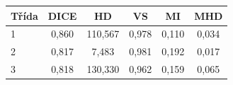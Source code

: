 \begin{tabular}{l c c c c c}
 \hline
Třída & DICE & HD & VS & MI & MHD \\ \hline
1 & 0,860 & 110,567 & 0,978 & 0,110 & 0,034 \\
2 & 0,817 & 7,483 & 0,981 & 0,192 & 0,017 \\
3 & 0,818 & 130,330 & 0,962 & 0,159 & 0,065 \\
\hline 
 \end{tabular}
